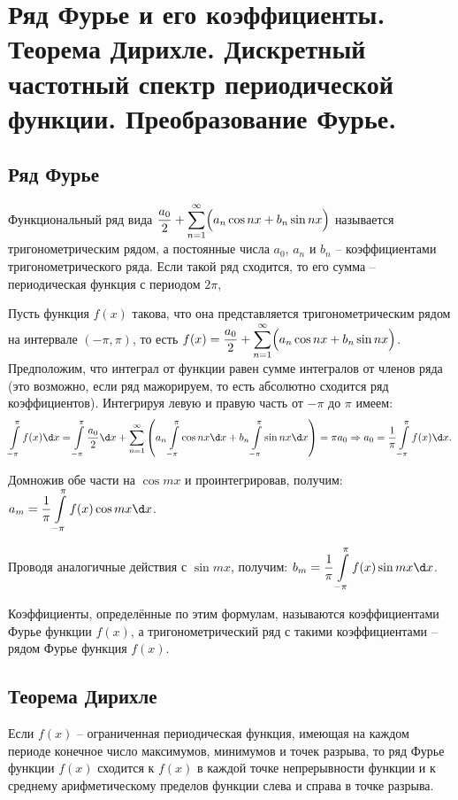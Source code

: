 \chapter{Ряд Фурье и его коэффициенты. Теорема Дирихле. Дискретный частотный
спектр периодической функции. Преобразование Фурье.}

\section{Ряд Фурье}
Функциональный ряд вида \( \displaystyle \frac{a_0}{2} + \sum\limits_{n=1}^\infty
\Bigl(a_n\cos nx + b_n\sin nx\Bigr) \) называется тригонометрическим рядом, а
постоянные числа \( a_0 \), \( a_n \) и \( b_n \) -- коэффициентами
тригонометрического ряда. Если такой ряд сходится, то его сумма -- периодическая
функция с периодом \( 2\pi \),

Пусть функция \( f(x) \) такова, что она представляется тригонометрическим рядом
на интервале \( (-\pi, \pi) \), то есть \( \displaystyle f(x) = \frac{a_0}{2} +
\sum\limits_{n=1}^\infty \Bigl(a_n\cos nx + b_n\sin nx\Bigr) \). Предположим,
что интеграл от функции равен сумме интегралов от членов ряда (это возможно,
если ряд мажорируем, то есть абсолютно сходится ряд коэффициентов). Интегрируя
левую и правую часть от \( -\pi \) до \( \pi \) имеем:
\[
    \int\limits_{-\pi}^\pi f(x)\d x = \int\limits_{-\pi}^\pi \frac{a_0}{2}\d x +
    \sum\limits_{n=1}^\infty \left(a_n\int\limits_{-\pi}^\pi \cos nx\d x + b_n
    \int\limits_{-\pi}^\pi \sin nx\d x\right) = \pi a_0 \Rightarrow
    a_0 = \frac{1}{\pi}\int\limits_{-\pi}^\pi f(x) \d x.
\]

Домножив обе части на \( \cos mx \) и проинтегрировав, получим:
\( \ds a_m = \frac{1}{\pi} \int\limits_{-\pi}^\pi f(x)\cos mx\d x \).

Проводя аналогичные действия с \( \sin mx \), получим:
\( \ds b_m = \frac{1}{\pi} \int\limits_{-\pi}^\pi f(x)\sin mx \d x \).

Коэффициенты, определённые по этим формулам, называются коэффициентами Фурье
функции \( f(x) \), а тригонометрический ряд с такими коэффициентами -- рядом
Фурье функция \( f(x) \).

\section{Теорема Дирихле}
Если \( f(x) \) -- ограниченная периодическая функция, имеющая на каждом периоде
конечное число максимумов, минимумов и точек разрыва, то ряд Фурье функции
\( f(x) \) сходится к \( f(x) \) в каждой точке непрерывности функции и к
среднему арифметическому пределов функции слева и справа в точке разрыва.

